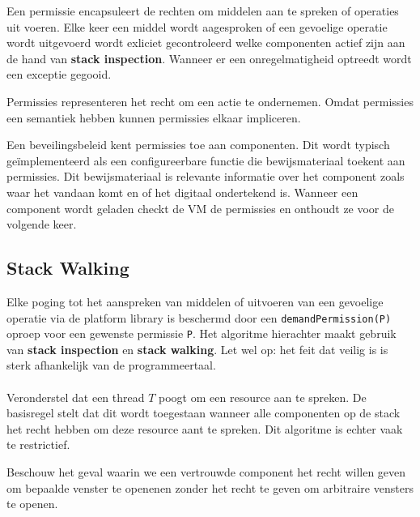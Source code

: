 \documentclass[../main.tex]{subfiles}
\begin{document}
Een permissie encapsuleert de rechten om middelen aan te spreken of operaties uit voeren. Elke keer een middel wordt aagesproken of een gevoelige operatie wordt uitgevoerd wordt exliciet gecontroleerd welke componenten actief zijn aan de hand van \textbf{stack inspection}. Wanneer er een onregelmatigheid optreedt wordt een exceptie gegooid.

Permissies representeren het recht om een actie te ondernemen. Omdat permissies een semantiek hebben kunnen permissies elkaar impliceren. 

Een beveilingsbeleid kent permissies toe aan componenten. Dit wordt typisch ge\"implementeerd als een configureerbare functie die bewijsmateriaal toekent aan permissies. Dit bewijsmateriaal is relevante informatie over het component zoals waar het vandaan komt en of het digitaal ondertekend is. Wanneer een component wordt geladen checkt de VM de permissies en onthoudt ze voor de volgende keer. 



\subsection{Stack Walking}
Elke poging tot het aanspreken van middelen of uitvoeren van een gevoelige operatie via de platform library is beschermd door een \texttt{demandPermission(P)} oproep voor een gewenste permissie \texttt{P}. Het algoritme hierachter maakt gebruik van \textbf{stack inspection} en \textbf{stack walking}. Let wel op: het feit dat veilig is is sterk afhankelijk van de programmeertaal.
\\\\
Veronderstel dat een thread $T$ poogt om een resource aan te spreken. De basisregel stelt dat dit wordt toegestaan wanneer alle componenten op de stack het recht hebben om deze resource aant te spreken. Dit algoritme is echter vaak te restrictief.

\begin{blockquote}
Beschouw het geval waarin we een vertrouwde component het recht willen geven om bepaalde venster te openenen zonder het recht te geven om arbitraire vensters te openen.
\end{blockquote}
\end{document}
